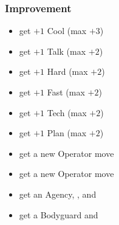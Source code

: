 \subsubsection{Improvement}
\begin{itemize}
\item get $+1$ Cool (max $+3$)
\item get $+1$ Talk (max $+2$)
\item get $+1$ Hard (max $+2$)
\item get $+1$ Fast (max $+2$)
\item get $+1$ Tech (max $+2$)
\item get $+1$ Plan (max $+2$)
\item get a new Operator move
\item get a new Operator move
\item get an Agency, , and 
\item get a Bodyguard and 
\end{itemize}